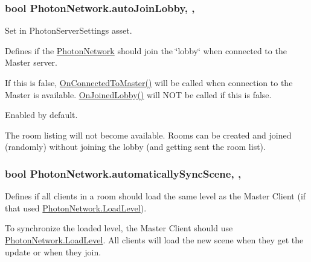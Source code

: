 \subsubsection[{\texorpdfstring{auto\+Join\+Lobby}{autoJoinLobby}}]{\setlength{\rightskip}{0pt plus 5cm}bool Photon\+Network.\+auto\+Join\+Lobby\hspace{0.3cm}{\ttfamily [static]}, {\ttfamily [get]}, {\ttfamily [set]}}\hypertarget{class_photon_network_ad534d4da7222bd8a6d8423cbd238d7f4}{}\label{class_photon_network_ad534d4da7222bd8a6d8423cbd238d7f4}


Set in Photon\+Server\+Settings asset. 

Defines if the \hyperlink{class_photon_network}{Photon\+Network} should join the \char`\"{}lobby\char`\"{} when connected to the Master server. 

If this is false, \hyperlink{group__public_api_ggaf30bbea51cc8c4b1ddc239d1c5c1468fa883ba3af22ed6fc336cde8cb71624d30}{On\+Connected\+To\+Master()} will be called when connection to the Master is available. \hyperlink{group__public_api_ggaf30bbea51cc8c4b1ddc239d1c5c1468fa2af1a9ab5a169e8800132c0625d3c6b2}{On\+Joined\+Lobby()} will N\+OT be called if this is false.

Enabled by default.

The room listing will not become available. Rooms can be created and joined (randomly) without joining the lobby (and getting sent the room list). 
\subsubsection[{\texorpdfstring{automatically\+Sync\+Scene}{automaticallySyncScene}}]{\setlength{\rightskip}{0pt plus 5cm}bool Photon\+Network.\+automatically\+Sync\+Scene\hspace{0.3cm}{\ttfamily [static]}, {\ttfamily [get]}, {\ttfamily [set]}}\hypertarget{class_photon_network_af721675dc5cf3c5ac4d4b67339246cdf}{}\label{class_photon_network_af721675dc5cf3c5ac4d4b67339246cdf}


Defines if all clients in a room should load the same level as the Master Client (if that used \hyperlink{class_photon_network_a5bb203a37b6db717583ea7b81fb56852}{Photon\+Network.\+Load\+Level}). 

To synchronize the loaded level, the Master Client should use \hyperlink{class_photon_network_a5bb203a37b6db717583ea7b81fb56852}{Photon\+Network.\+Load\+Level}. All clients will load the new scene when they get the update or when they join.

